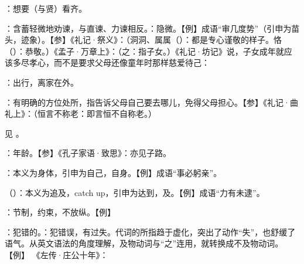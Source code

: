 {
\item {}：想要（与贤）看齐。
}
{}


{
\item {}：含蓄轻微地劝谏，与直谏、力谏相反。：隐微。【例】成语“审几度势”（引申为苗头，迹象）。【参】《礼记·祭义》：（洞洞、属属（）：都是专心谨敬的样子。恪（）：恭敬。）《孟子·万章上》：（之：指子女。）《礼记·坊记》说，子女成年就应该多尽孝心，而不是要求父母还像童年时那样慈爱待己：
}
{}


{
\item {}：出行，离家在外。
\item {}：有明确的方位处所，指告诉父母自己要去哪儿，免得父母担心。【参】《礼记·曲礼上》：（恒言不称老：即言恒不自称老。）
}
{}


{
见 。
}
{}


{
\item {}：年龄。【参】《孔子家语·致思》：亦见子路。
}
{}


{
\item {}：本义为身体，引申为自己，自身。【例】成语“事必躬亲”。
\item {}（）：本义为追及，catch up，引申为达到，及。【例】成语“力有未逮”。
}
{}


{
\item {}：节制，约束，不放纵。【例】 

\item {}：犯错的。：犯错误，有过失。代词的所指趋于虚化，突出了动作“失”，也舒缓了语气。从英文语法的角度理解，及物动词与“之”连用，就转换成不及物动词。【例】 《左传·庄公十年》：
}
{}



